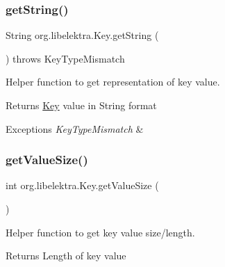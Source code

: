 \subsubsection{\texorpdfstring{get\+String()}{getString()}}
{\footnotesize\ttfamily String org.\+libelektra.\+Key.\+get\+String (\begin{DoxyParamCaption}{ }\end{DoxyParamCaption}) throws Key\+Type\+Mismatch\hspace{0.3cm}{\ttfamily [inline]}}



Helper function to get representation of key value. 

\begin{DoxyReturn}{Returns}
\hyperlink{classorg_1_1libelektra_1_1Key}{Key} value in String format 
\end{DoxyReturn}

\begin{DoxyExceptions}{Exceptions}
{\em Key\+Type\+Mismatch} & \\
\hline
\end{DoxyExceptions}
\mbox{\label{classorg_1_1libelektra_1_1Key_aeb1c3e899a17778c8511a08ee0472e43}} 
\subsubsection{\texorpdfstring{get\+Value\+Size()}{getValueSize()}}
{\footnotesize\ttfamily int org.\+libelektra.\+Key.\+get\+Value\+Size (\begin{DoxyParamCaption}{ }\end{DoxyParamCaption})\hspace{0.3cm}{\ttfamily [inline]}}



Helper function to get key value size/length. 

\begin{DoxyReturn}{Returns}
Length of key value 
\end{DoxyReturn}
\mbox{\label{classorg_1_1libelektra_1_1Key_af9a7a7941c07c058f1d4bd6c55e20fe9}} 
